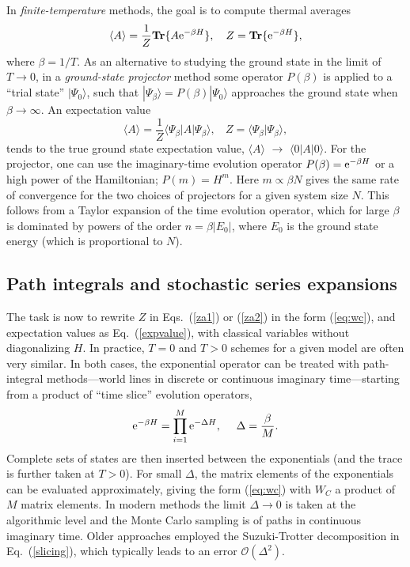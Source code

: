 \documentclass[10pt,pre,aps,twocolumn,showpacs,subscriptaddresses,floatfix]{revtex4}
\begin{document}
In {\it finite-temperature} methods, the goal is to compute thermal averages
\begin{equation}
\langle A\rangle = \frac{1}{Z}{\bf Tr}\{ A{\rm e}^{-\beta H}\},~~~
Z = {\bf Tr}\{ {\rm e}^{-\beta H}\},
\label{za1}
\end{equation}
where $\beta=1/T$. As an alternative to studying the ground state in the limit of  $T\to 0$, in a {\it ground-state projector} method some 
operator $P(\beta)$  is applied to a ``trial state'' $|\Psi_0\rangle$, such that $|\Psi_\beta \rangle = P(\beta)|\Psi_0\rangle$ approaches the 
ground state when $\beta \to \infty$. An expectation value
\begin{equation}
\langle A\rangle = \frac{1}{Z}\langle \Psi_\beta|A|\Psi_\beta\rangle,~~~~ Z = \langle \Psi_\beta|\Psi_\beta\rangle,
\label{za2}
\end{equation}
tends to the true ground state expectation value, $\langle A\rangle$ $\to$ $\langle 0| A|0\rangle$. For the projector, one can use the imaginary-time
evolution operator $P(\beta)={\rm e}^{-\beta H}$ or a high power of the Hamiltonian; $P(m)=H^m$. Here $m \propto \beta N$ gives the same rate of 
convergence for the two choices of projectors for a given system size $N$. This follows from a Taylor expansion of the time evolution operator, which for large 
$\beta$ is dominated by powers of the order $n=\beta |E_0|$, where $E_0$ is the ground state energy (which is proportional to $N$).

\subsection{Path integrals and stochastic series expansions}

The task is now to rewrite $Z$ in Eqs.~(\ref{za1}) or (\ref{za2}) in the form (\ref{eq:wc}), and expectation values as Eq.~(\ref{expvalue}), with classical variables 
without diagonalizing $H$. In practice, $T=0$ and $T>0$ schemes for a given model are often very similar. In both cases, the exponential 
operator can be treated with path-integral methods---world lines in discrete \cite{Suzuki77,Hirsch82} or continuous \cite{Beard96,Prokofev96,Prokofev98} 
imaginary time---starting from a product of ``time slice'' evolution operators,
\begin{equation}
{\rm e}^{-\beta H}= \prod_{i=1}^M {\rm e}^{-\Delta H},~~~~ \Delta=\frac{\beta}{M}.
\label{slicing}
\end{equation}
Complete sets of states are then inserted between the exponentials (and the trace is further taken at $T>0$). For small $\Delta$, the
matrix elements of the exponentials can be evaluated approximately, giving the form (\ref{eq:wc}) with $W_C$ a product of $M$ matrix elements. 
In modern methods the limit $\Delta \to 0$ is taken at the algorithmic level \cite{Prokofev96,WormA,Beard96} and the Monte Carlo sampling is of 
paths in continuous imaginary time. Older approaches employed the Suzuki-Trotter decomposition \cite{Suzuki76} in Eq.~(\ref{slicing}), which 
typically leads to an error $\mathcal{O}(\Delta^2)$.
\end{document}

